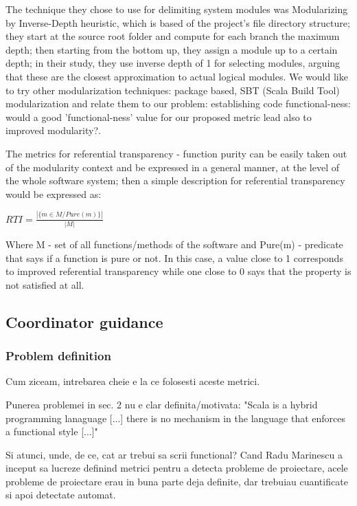 \documentclass{article}
\begin{document}
The technique they chose to use for delimiting system modules  was Modularizing by  Inverse-Depth heuristic, which is based of the project's file directory structure; they start at the source root folder and compute for each branch the maximum depth; then starting from the bottom up, they assign a module up to a certain depth; in their study, they use inverse depth of 1 for selecting modules, arguing that these are the closest approximation to actual logical modules. We would like to try other modularization techniques: package based, SBT (Scala Build Tool)  modularization and relate them to our problem: establishing code functional-ness: would a good 'functional-ness' value for our proposed metric lead also to improved modularity?.\par

The metrics for referential transparency - function purity can be easily taken out of the modularity context and be expressed in a general manner, at the level of the whole software system; then a simple description for referential transparency would be expressed as:  \par
\begin{center}
\begin{math}
  RTI = \frac{ | \{ m \in M / Pure(m) \} | } { | M | }
\end{math}
\end{center}

Where  M - set of all functions/methods of the software and  Pure(m) - predicate that says if a function is pure or not. In this case, a value close to 1 corresponds to improved referential transparency while one close to 0 says that the property is not satisfied at all. \par

\subsection {Coordinator guidance}

\subsubsection {Problem definition}
Cum ziceam, intrebarea cheie e la ce folosesti aceste metrici.

Punerea problemei in sec. 2 nu e clar definita/motivata:
"Scala is a hybrid programming lanaguage [...] there is no mechanism in
the language that enforces a functional style [...]"

Si atunci, unde, de ce, cat ar trebui sa scrii functional?
Cand Radu Marinescu a inceput sa lucreze definind metrici pentru a detecta
probleme de proiectare, acele probleme de proiectare erau in buna parte
deja definite, dar trebuiau cuantificate si apoi detectate automat.
\end{document}
